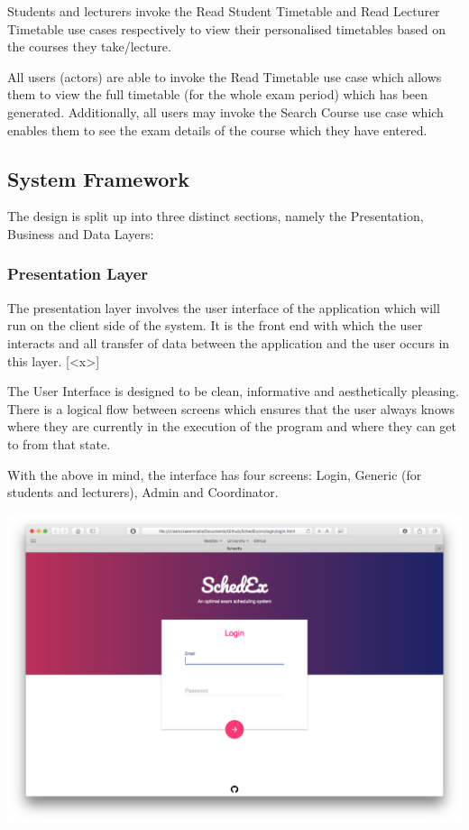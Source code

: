 \documentclass{article}
\begin{document}
Students and lecturers invoke the Read Student Timetable and Read Lecturer Timetable use cases respectively to view their personalised timetables based on the courses they take/lecture.

All users (actors) are able to invoke the Read Timetable use case which allows them to view the full timetable (for the whole exam period) which has been generated. Additionally, all users may invoke the Search Course use case which enables them to see the exam details of the course which they have entered.

\subsection{System Framework}
The design is split up into three distinct sections, namely the Presentation, Business and Data Layers: 

\subsubsection{Presentation Layer}
The presentation layer involves the user interface of the application which will run on the client side of the system. It is the front end with which the user
interacts and all transfer of data between the application and the user occurs in this layer. [<x>]

The User Interface is designed to be clean, informative and aesthetically pleasing. There is a logical flow
between screens which ensures that the user always knows where they are currently in the execution of
the program and where they can get to from that state.

With the above in mind, the interface has four screens: Login, Generic (for students and lecturers), Admin and Coordinator.

\centerline{\includegraphics[scale=0.4]{login}} 
\end{document}
